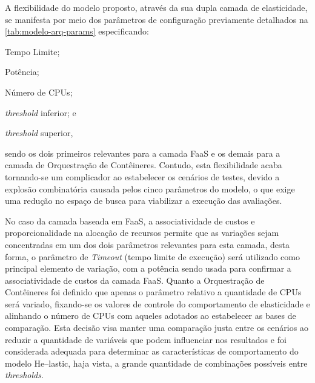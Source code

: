 \documentclass[english,brazilian]{UNISINOSmonografia} %
\begin{document}
A flexibilidade do modelo proposto, através da sua dupla camada de elasticidade, se manifesta por meio dos parâmetros de configuração previamente detalhados na \autoref{tab:modelo-arq-params} especificando: 
\begin{inparaenum} 
	\item Tempo Limite;
	\item Potência;
	\item Número de CPUs;
	\item \textit{threshold} inferior; e
	\item \textit{threshold} superior,
\end{inparaenum} sendo os dois primeiros relevantes para a camada FaaS e os demais para a camada de Orquestração de Contêineres.
Contudo, esta flexibilidade acaba tornando-se um complicador ao estabelecer os cenários de testes, devido a explosão combinatória causada pelos cinco parâmetros do modelo, o que exige uma redução no espaço de busca para viabilizar a execução das avaliações.


No caso da camada baseada em FaaS, a associatividade de custos e proporcionalidade na alocação de recursos permite que as variações sejam concentradas em um dos dois parâmetros relevantes para esta camada, desta forma, o parâmetro de \textit{Timeout} (tempo limite de execução) será utilizado como principal elemento de variação, com a potência sendo usada para confirmar a associatividade de custos da camada FaaS.
Quanto a Orquestração de Contêineres foi definido que apenas o parâmetro relativo a quantidade de CPUs será variado, fixando-se os valores de controle do comportamento de elasticidade e alinhando o número de CPUs com aqueles adotados ao estabelecer as bases de comparação.
Esta decisão visa manter uma comparação justa entre os cenários ao reduzir a quantidade de variáveis que podem influenciar nos resultados e foi considerada adequada para determinar as características de comportamento do modelo \textsf{He}--lastic, haja vista, a grande quantidade de combinações possíveis entre \textit{thresholds}.
\end{document}
